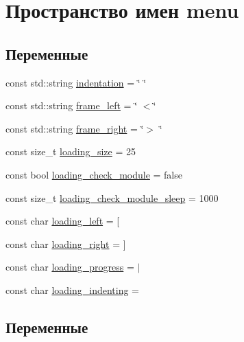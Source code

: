 \hypertarget{namespacemenu}{}\section{Пространство имен menu}
\label{namespacemenu}
\subsection*{Переменные}
\begin{DoxyCompactItemize}
\item 
const std\+::string \hyperlink{namespacemenu_ac0906d6effd5dc68552a724a3edb9330}{indentation} = \char`\"{} \char`\"{}
\item 
const std\+::string \hyperlink{namespacemenu_ab9230afa22bdf260e3944290026a5a86}{frame\+\_\+left} = \char`\"{} $<$\char`\"{}
\item 
const std\+::string \hyperlink{namespacemenu_a3f786c7ab3caec7dfef9e1fa61b52ae7}{frame\+\_\+right} = \char`\"{}$>$ \char`\"{}
\item 
const size\+\_\+t \hyperlink{namespacemenu_aa3bc0d7f62e04dc52dd8f276902448ae}{loading\+\_\+size} = 25
\item 
const bool \hyperlink{namespacemenu_aaea5c70964114a416caa58676ddf8066}{loading\+\_\+check\+\_\+module} = false
\item 
const size\+\_\+t \hyperlink{namespacemenu_a69bce854c4a150920a5c77eede8cab0a}{loading\+\_\+check\+\_\+module\+\_\+sleep} = 1000
\item 
const char \hyperlink{namespacemenu_a56af6a2d586e2b6baa4ebf128a690266}{loading\+\_\+left} = \textquotesingle{}\mbox{[}\textquotesingle{}
\item 
const char \hyperlink{namespacemenu_a272b2c0c591457b2aeccaae0c122a1fc}{loading\+\_\+right} = \textquotesingle{}\mbox{]}\textquotesingle{}
\item 
const char \hyperlink{namespacemenu_ab79f369195d81dcb241b1ab5269c9d3d}{loading\+\_\+progress} = \textquotesingle{}$\vert$\textquotesingle{}
\item 
const char \hyperlink{namespacemenu_ad004c327a8a1c14388a6c7f23d6953a6}{loading\+\_\+indenting} = \textquotesingle{} \textquotesingle{}
\end{DoxyCompactItemize}


\subsection{Переменные}
\mbox{\label{namespacemenu_ab9230afa22bdf260e3944290026a5a86}} 
